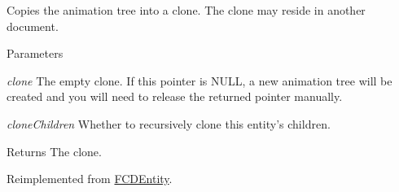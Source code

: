 \label{classFCDAnimation_a1b23f8e4444121882edf5418c094b023}
Copies the animation tree into a clone. The clone may reside in another document. 
\begin{DoxyParams}{Parameters}
\item[{\em clone}]The empty clone. If this pointer is NULL, a new animation tree will be created and you will need to release the returned pointer manually. \item[{\em cloneChildren}]Whether to recursively clone this entity's children. \end{DoxyParams}
\begin{DoxyReturn}{Returns}
The clone. 
\end{DoxyReturn}


Reimplemented from \hyperlink{classFCDEntity_afd21dc9f9dba45786012dea87f70b9fc}{FCDEntity}.

